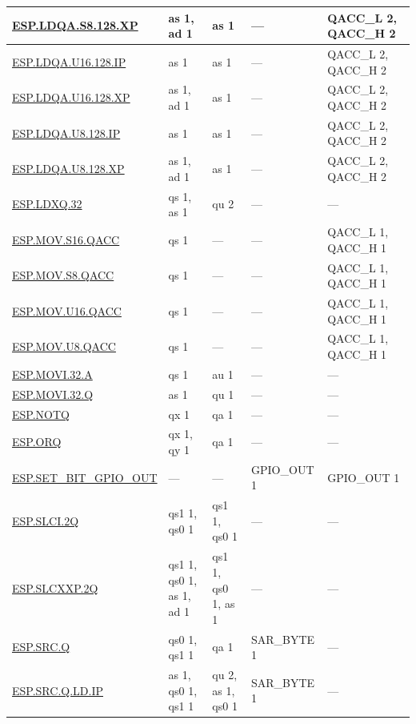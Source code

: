 \begin{longtable}[c]{|l|m{2.5cm}|m{2.5cm}|m{2.5cm}|m{2.5cm}|}
    \hyperref[instruction:ESPLDQAS8128XP]{ESP.LDQA.S8.128.XP} & as 1, ad 1 & as 1 & — & QACC\_L 2, QACC\_H 2\\\hline
    \hyperref[instruction:ESPLDQAU16128IP]{ESP.LDQA.U16.128.IP} & as 1 & as 1 & — & QACC\_L 2, QACC\_H 2\\\hline
    \hyperref[instruction:ESPLDQAU16128XP]{ESP.LDQA.U16.128.XP} & as 1, ad 1 & as 1 & — & QACC\_L 2, QACC\_H 2\\\hline
    \hyperref[instruction:ESPLDQAU8128IP]{ESP.LDQA.U8.128.IP} & as 1 & as 1 & — & QACC\_L 2, QACC\_H 2\\\hline
    \hyperref[instruction:ESPLDQAU8128XP]{ESP.LDQA.U8.128.XP} & as 1, ad 1 & as 1 & — & QACC\_L 2, QACC\_H 2\\\hline
    \hyperref[instruction:ESPLDXQ32]{ESP.LDXQ.32} & qs 1, as 1 & qu 2 & — & — \\\hline
    \hyperref[instruction:ESPMOVS16QACC]{ESP.MOV.S16.QACC} & qs 1 & — & — & QACC\_L 1, QACC\_H 1\\\hline
    \hyperref[instruction:ESPMOVS8QACC]{ESP.MOV.S8.QACC} & qs 1 & — & — & QACC\_L 1, QACC\_H 1\\\hline
    \hyperref[instruction:ESPMOVU16QACC]{ESP.MOV.U16.QACC} & qs 1 & — & — & QACC\_L 1, QACC\_H 1\\\hline
    \hyperref[instruction:ESPMOVU8QACC]{ESP.MOV.U8.QACC} & qs 1 & — & — & QACC\_L 1, QACC\_H 1\\\hline
    \hyperref[instruction:ESPMOVI32A]{ESP.MOVI.32.A} & qs 1 & au 1 & — & — \\\hline
    \hyperref[instruction:ESPMOVI32Q]{ESP.MOVI.32.Q} & as 1 & qu 1 & — & — \\\hline
    \hyperref[instruction:ESPNOTQ]{ESP.NOTQ} & qx 1 & qa 1 & — & — \\\hline
    \hyperref[instruction:ESPORQ]{ESP.ORQ} & qx 1, qy 1 & qa 1 & — & — \\\hline
    \hyperref[instruction:ESPSETBITGPIOOUT]{ESP.SET\_BIT\_GPIO\_OUT} & — & — & GPIO\_OUT 1 & GPIO\_OUT 1 \\\hline
    \hyperref[instruction:ESPSLCI2Q]{ESP.SLCI.2Q} & qs1 1, qs0 1 & qs1 1, qs0 1 & — & — \\\hline
    \hyperref[instruction:ESPSLCXXP2Q]{ESP.SLCXXP.2Q} & qs1 1, qs0 1, as 1, ad 1 & qs1 1, qs0 1, as 1 & — & — \\\hline
    \hyperref[instruction:ESPSRCQ]{ESP.SRC.Q} & qs0 1, qs1 1 & qa 1 & SAR\_BYTE 1 & — \\\hline
    \hyperref[instruction:ESPSRCQLDIP]{ESP.SRC.Q.LD.IP} & as 1, qs0 1, qs1 1 & qu 2, as 1, qs0 1 & SAR\_BYTE 1 & — \\\hline

\end{longtable}
